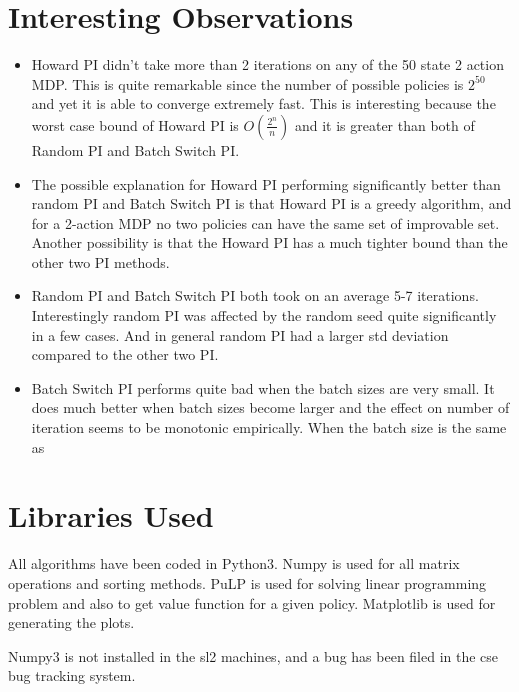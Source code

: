 \documentclass{article}
\begin{document}
\section{Interesting Observations}
\begin{itemize}
\item Howard PI didn't take more than 2 iterations on any of the 50 state 2 action MDP. This is quite remarkable since the number of possible policies is $2^{50}$ and yet it is able to converge extremely fast. This is interesting because the worst case bound of Howard PI is $O(\frac{2^n}{n})$ and it is greater than both of Random PI and Batch Switch PI.
\item The possible explanation for Howard PI performing significantly better than random PI and Batch Switch PI is that Howard PI is a greedy algorithm, and for a 2-action MDP no two policies can have the same set of improvable set. Another possibility is that the Howard PI has a much tighter bound than the other two PI methods.
\item Random PI and Batch Switch PI both took on an average 5-7 iterations. Interestingly random PI was affected by the random seed quite significantly in a few cases. And in general random PI had a larger std deviation compared to the other two PI.
\item Batch Switch PI performs quite bad when the batch sizes are very small. It does much better when batch sizes become larger and the effect on number of iteration seems to be monotonic empirically. When the batch size is the same as
\end{itemize}

\section{Libraries Used}
All algorithms have been coded in Python3. Numpy is used for all matrix operations and sorting methods. PuLP is used for solving linear programming problem and also to get value function for a given policy. Matplotlib is used for generating the plots.

Numpy3 is not installed in the sl2 machines, and a bug has been filed in the cse bug tracking system.
\end{document}

